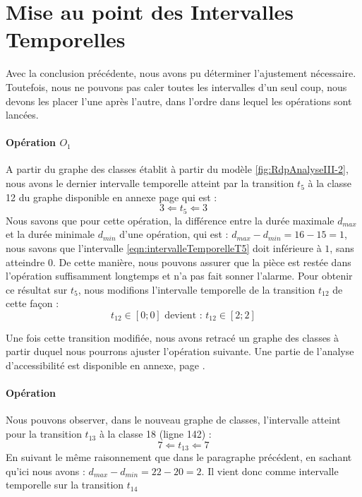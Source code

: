 
\section{Mise au point des Intervalles Temporelles}
Avec la conclusion précédente, nous avons pu déterminer l'ajustement nécessaire. Toutefois, nous ne pouvons pas caler toutes les intervalles d'un seul coup, nous devons les placer l'une après l'autre, dans l'ordre dans lequel les opérations sont lancées.

\paragraph*{Opération $O_1$}
A partir du graphe des classes établit à partir du modèle \ref{fig:RdpAnalyseIII-2}, nous avons le dernier intervalle temporelle atteint par la transition $t_5$ à la classe 12 du graphe disponible en annexe page \pageref{Annex:analyse} qui est :
\begin{equation}\label{eqn:intervalleTemporelleT5}
3 \Leftarrow t_5 \Leftarrow 3
\end{equation} 
Nous savons que pour cette opération, la différence entre la durée maximale $d_{max}$ et la durée minimale $d_{min}$ d'une opération, qui est : $d_{max} - d_{min} = 16-15 = 1$, nous savons que l'intervalle \ref{eqn:intervalleTemporelleT5} doit inférieure à $1$, sans atteindre $0$. De cette manière, nous pouvons assurer que la pièce est restée dans l'opération suffisamment longtemps et n'a pas fait sonner l'alarme. Pour obtenir ce résultat sur $t_5$, nous modifions l'intervalle temporelle de la transition $t_{12}$ de cette façon : 
\begin{equation}
t_{12} \in [0;0] \text{ devient : }t_{12} \in [2;2] 
\end{equation}


Une fois cette transition modifiée, nous avons retracé un graphe des classes à partir duquel nous pourrons ajuster l'opération suivante. Une partie de l'analyse d'accessibilité est disponible en annexe, page \pageref{Annex:GDC-miseauPointI-Ope1}.

\paragraph*{Opération}
Nous pouvons observer, dans le nouveau graphe de classes, l'intervalle atteint pour la transition $t_{13}$ à la classe 18 (ligne 142) : 
\begin{equation}
7 \Leftarrow t_{13} \Leftarrow 7
\end{equation}
En suivant le même raisonnement que dans le paragraphe précédent, en sachant qu'ici nous avons :  $d_{max} - d_{min} = 22-20 = 2$. Il vient donc comme intervalle temporelle sur la transition $t_{14}$

